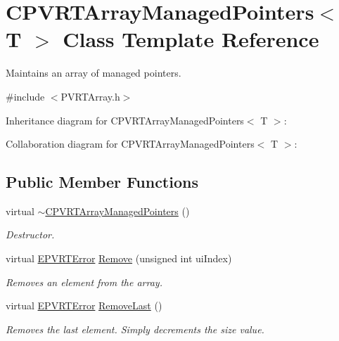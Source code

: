 \hypertarget{class_c_p_v_r_t_array_managed_pointers}{\section{C\+P\+V\+R\+T\+Array\+Managed\+Pointers$<$ T $>$ Class Template Reference}
\label{class_c_p_v_r_t_array_managed_pointers}
}


Maintains an array of managed pointers.  




{\ttfamily \#include $<$P\+V\+R\+T\+Array.\+h$>$}



Inheritance diagram for C\+P\+V\+R\+T\+Array\+Managed\+Pointers$<$ T $>$\+:


Collaboration diagram for C\+P\+V\+R\+T\+Array\+Managed\+Pointers$<$ T $>$\+:
\subsection*{Public Member Functions}
\begin{DoxyCompactItemize}
\item 
virtual \hyperlink{class_c_p_v_r_t_array_managed_pointers_aac0b1045e6786a7781b54b9e0512e87c}{$\sim$\+C\+P\+V\+R\+T\+Array\+Managed\+Pointers} ()
\begin{DoxyCompactList}\small\item\em Destructor. \end{DoxyCompactList}\item 
virtual \hyperlink{_p_v_r_t_error_8h_a9e837ff1a83f3a5f332bc4cc78454608}{E\+P\+V\+R\+T\+Error} \hyperlink{class_c_p_v_r_t_array_managed_pointers_ab316479721a0bceee282049d0341751b}{Remove} (unsigned int ui\+Index)
\begin{DoxyCompactList}\small\item\em Removes an element from the array. \end{DoxyCompactList}\item 
virtual \hyperlink{_p_v_r_t_error_8h_a9e837ff1a83f3a5f332bc4cc78454608}{E\+P\+V\+R\+T\+Error} \hyperlink{class_c_p_v_r_t_array_managed_pointers_afd1a21aefc381f30b3de14f0ffe2ea2d}{Remove\+Last} ()
\begin{DoxyCompactList}\small\item\em Removes the last element. Simply decrements the size value. \end{DoxyCompactList}\end{DoxyCompactItemize}
